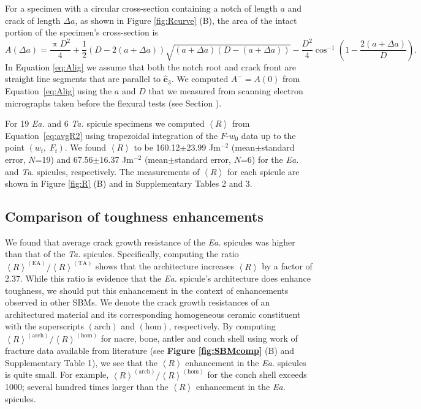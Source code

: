 \documentclass[12pt,onecolumn]{article}
\makeatletter
\DeclareRobustCommand*{\nameref}[1]{%
      \emph{\myorg@nameref{#1}}%
    }%
\newcommand{\ez}{\hat{\mathbf{e}}_3}
\newcommand{\TA}{\textit{Ta.\@}\xspace}
\newcommand{\EA}{\textit{Ea.\@}\xspace}
\makeatother
\begin{document}
\begin{bibunit}
For a specimen with a circular cross-section containing a notch of length $a$ and crack of length $\Delta a$, as shown in Figure \ref{fig:Rcurve} (B), the area of the intact portion of the specimen's cross-section is
%
\begin{equation}
    \label{eq:Alig}
    A(\Delta a)=\frac{\uppi D^2}{4}+\frac{1}{2}\left(D-2(a+\Delta a)\right)\sqrt{(a+\Delta a)(D-(a+\Delta a))}-\frac{D^2}{4}\cos^{-1}\left(1-\frac{2(a+\Delta a)}{D}\right).
\end{equation}
%
In Equation \eqref{eq:Alig} we assume that both the notch root and crack front are straight line segments that are parallel to $\ez$. We computed $A^-=A(0)$ from Equation~\eqref{eq:Alig} using the $a$ and $D$ that we measured from scanning electron micrographs taken before the flexural tests (see Section \nameref{sec:res}).

For 19 \EA and 6 \TA spicule specimens we computed $\left< R\right>$ from Equation~\eqref{eq:avgR2} using trapezoidal integration of the $F$-$w_0$ data up to the point $(w_\mathrm{f}, \; F_\mathrm{f})$. We found  $\left< R \right>$ to be 160.12$\pm$23.99 Jm$^{-2}$ (mean$\pm$standard error, $N$=19) and 67.56$\pm$16.37 Jm$^{-2}$ (mean$\pm$standard error, $N$=6) for the \EA and \TA spicules, respectively. The measurements of $\left< R \right>$ for each spicule are shown in Figure \ref{fig:R} (B) and in Supplementary Tables 2 and 3.

\subsection*{Comparison of toughness enhancements}
\label{sec:Rcomp}
We found that average crack growth resistance of the \EA spicules was higher than that of the \TA spicules. Specifically, computing the ratio $\left< R\right>^{(\mathrm{EA})}/\left< R\right>^{(\mathrm{TA})}$ shows that the architecture increases $\left< R\right>$ by a factor of 2.37. While this ratio is evidence that the \EA spicule's architecture does enhance toughness, we should put this enhancement in the context of enhancements observed in other SBMs. We denote the crack growth resistances of an architectured material and its corresponding homogeneous ceramic constituent with the superscripts $(\mathrm{arch})$ and $(\mathrm{hom})$, respectively. By computing $\left< R\right>^{(\mathrm{arch})}/\left< R\right>^{(\mathrm{hom})}$ for nacre, bone, antler and conch shell using work of fracture data available from literature (see {\bf Figure \ref{fig:SBMcomp}} (B) and Supplementary Table 1), we see that the $\left< R \right>$ enhancement in the \EA spicules is quite small. For example, $\left< R\right>^{(\mathrm{arch})}/\left< R\right>^{(\mathrm{hom})}$ for the conch shell exceeds 1000; several hundred times larger than the $\left< R \right>$ enhancement in the \EA spicules.


\end{bibunit}
\end{document}
